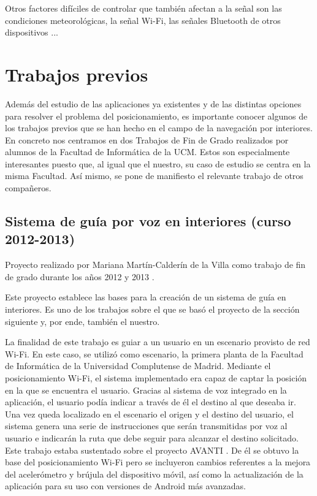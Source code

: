 Otros factores difíciles de controlar que también afectan a la señal son las condiciones meteorológicas, la señal Wi-Fi, las señales Bluetooth de otros dispositivos \citep{beaconsinterferences}...


\section{Trabajos previos}
\label{sec:trabajos_previos}

Además del estudio de las aplicaciones ya existentes y de las distintas opciones para resolver el problema del posicionamiento, es importante conocer algunos de los trabajos previos que se han hecho en el campo de la navegación por interiores. En concreto nos centramos en dos Trabajos de Fin de Grado realizados por alumnos de la Facultad de Informática de la UCM. Estos son especialmente interesantes puesto que, al igual que el nuestro, su caso de estudio se centra en la misma Facultad. Así mismo, se pone de manifiesto el relevante trabajo de otros compañeros.


\subsection{Sistema de guía por voz en interiores (curso 2012-2013)}

Proyecto realizado por Mariana Martín-Calderín de la Villa como trabajo de fin de grado durante los años 2012 y 2013 \citep{TFGMariana}.

Este proyecto establece las bases para la creación de un sistema de guía en interiores. Es uno de los trabajos sobre el que se basó el proyecto de la sección siguiente y, por ende, también el nuestro. 

La finalidad de este trabajo es guiar a un usuario en un escenario provisto de red Wi-Fi. En este caso, se utilizó como escenario, la primera planta de la Facultad de Informática de la Universidad Complutense de Madrid. Mediante el posicionamiento Wi-Fi, el sistema  implementado era capaz de captar la posición en la que se encuentra el usuario. Gracias al sistema de voz integrado en la aplicación, el usuario podía indicar a través de él el destino al que deseaba ir. Una vez queda localizado en el escenario el origen y el destino del usuario, el sistema genera una serie de instrucciones que serán transmitidas por voz al usuario e indicarán la ruta que debe seguir para alcanzar el destino solicitado. Este trabajo estaba sustentado sobre el proyecto AVANTI \citep{avanti}. De él se obtuvo la base del posicionamiento Wi-Fi pero se incluyeron cambios referentes a la mejora del acelerómetro y brújula del dispositivo móvil, así como la actualización de la aplicación para su uso con versiones de Android más avanzadas.


